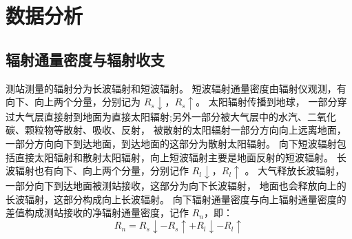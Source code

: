 \chapter{数据分析}
\section{辐射通量密度与辐射收支}
测站测量的辐射分为长波辐射和短波辐射。
短波辐射通量密度由辐射仪观测，有向下、向上两个分量，分别记为 \(R_{s}\downarrow\)，\(R_{s}\uparrow\)。
太阳辐射传播到地球，
一部分穿过大气层直接射到地面为直接太阳辐射;另外一部分被大气层中的水汽、二氧化碳、颗粒物等散射、吸收、反射，
被散射的太阳辐射一部分方向向上远离地面，一部分方向向下到达地面，到达地面的这部分为散射太阳辐射。
向下短波辐射包括直接太阳辐射和散射太阳辐射，向上短波辐射主要是地面反射的短波辐射。
长波辐射也有向下、向上两个分量，分别记作 \(R_{l}\downarrow\)，\(R_{l}\uparrow\) 。
大气释放长波辐射，一部分向下到达地面被测站接收，这部分为向下长波辐射，
地面也会释放向上的长波辐射，这部分构成向上长波辐射。\cite{tagkey2006}
向下辐射通量密度与向上辐射通量密度的差值构成测站接收的净辐射通量密度，记作 \(R_n\)，即：
\begin{equation}\label{eq:Rn}
  R_n = R_{s}\downarrow - R_{s}\uparrow + R_{l}\downarrow - R_{l}\uparrow
\end{equation}

